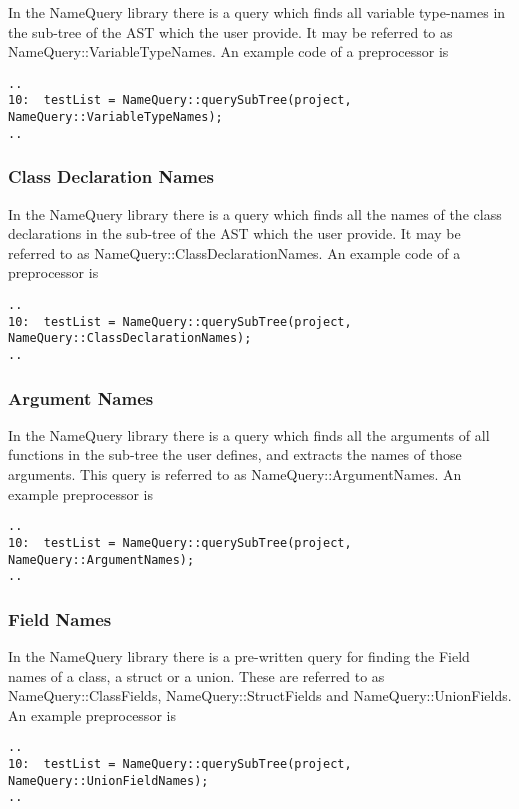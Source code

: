 {In the NameQuery library there is a query which finds all variable 
type-names in the sub-tree of the AST which the user provide. It may be
referred to as NameQuery::VariableTypeNames. An example code of a
preprocessor is
\begin{verbatim}
..  
10:  testList = NameQuery::querySubTree(project, NameQuery::VariableTypeNames);
..
\end{verbatim}

\subsubsection{Class Declaration Names}


In the NameQuery library there is a query which finds all the names of
the class declarations in the sub-tree of the AST which the user provide. It may be
referred to as NameQuery::ClassDeclarationNames. An example code of a
preprocessor is
\begin{verbatim}
..  
10:  testList = NameQuery::querySubTree(project, NameQuery::ClassDeclarationNames);
..
\end{verbatim}

\subsubsection{Argument Names}

In the NameQuery library there is a query which finds all the
arguments of all functions in the sub-tree the user defines, and
extracts the names of those arguments. This query is referred to as
NameQuery::ArgumentNames. An example preprocessor is

\begin{verbatim}
..  
10:  testList = NameQuery::querySubTree(project, NameQuery::ArgumentNames);
..
\end{verbatim}

\subsubsection{Field Names}

In the NameQuery library there is a pre-written query for finding the
Field names of a class, a struct or a union. These are referred to as
NameQuery::ClassFields, NameQuery::StructFields and
NameQuery::UnionFields. An example preprocessor is
\begin{verbatim}
..
10:  testList = NameQuery::querySubTree(project, NameQuery::UnionFieldNames);
..
\end{verbatim}

}
